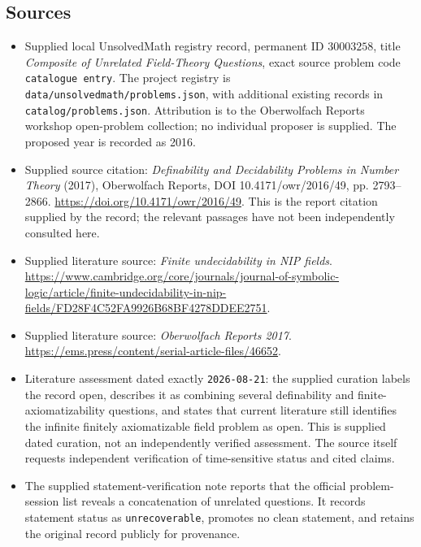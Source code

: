 \documentclass[11pt]{article}
\begin{document}
\subsection{Sources}
\begin{itemize}
\item Supplied local UnsolvedMath registry record, permanent ID \(30003258\), title \emph{Composite of Unrelated Field-Theory Questions}, exact source problem code \texttt{catalogue entry}. The project registry is \texttt{data/unsolvedmath/problems.json}, with additional existing records in \texttt{catalog/problems.json}. Attribution is to the Oberwolfach Reports workshop open-problem collection; no individual proposer is supplied. The proposed year is recorded as 2016.
\item Supplied source citation: \emph{Definability and Decidability Problems in Number Theory} (2017), Oberwolfach Reports, DOI 10.4171/owr/2016/49, pp. 2793--2866. \url{https://doi.org/10.4171/owr/2016/49}. This is the report citation supplied by the record; the relevant passages have not been independently consulted here.
\item Supplied literature source: \emph{Finite undecidability in NIP fields}. \url{https://www.cambridge.org/core/journals/journal-of-symbolic-logic/article/finite-undecidability-in-nip-fields/FD28F4C52FA9926B68BF4278DDEE2751}.
\item Supplied literature source: \emph{Oberwolfach Reports 2017}. \url{https://ems.press/content/serial-article-files/46652}.
\item Literature assessment dated exactly \texttt{2026-08-21}: the supplied curation labels the record open, describes it as combining several definability and finite-axiomatizability questions, and states that current literature still identifies the infinite finitely axiomatizable field problem as open. This is supplied dated curation, not an independently verified assessment. The source itself requests independent verification of time-sensitive status and cited claims.
\item The supplied statement-verification note reports that the official problem-session list reveals a concatenation of unrelated questions. It records statement status as \texttt{unrecoverable}, promotes no clean statement, and retains the original record publicly for provenance.
\end{itemize}
\end{document}
